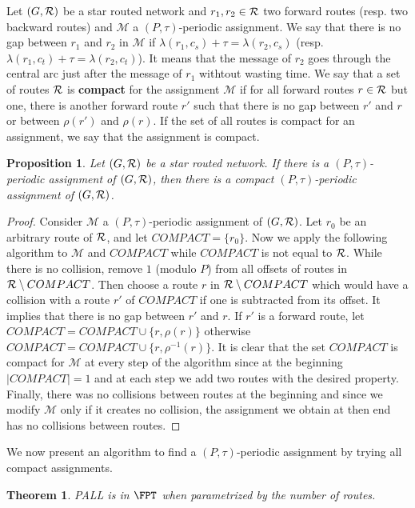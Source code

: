 \documentclass[a4paper,10pt]{article}
\newtheorem{proposition}{Proposition}
\newtheorem{theorem}{Theorem}
\begin{document}
Let $(G, {\cal R})$ be a star routed network and $r_1,r_2 \in {\cal R}$ two forward routes (resp. two backward routes) and 
$\mathcal{M}$ a $(P,\tau)$-periodic assignment. We say that there is no gap between $r_1$ and $r_2$ in $\mathcal{M}$ if $\lambda(r_1,c_s) + \tau = \lambda(r_2,c_s)$ (resp. $\lambda(r_1,c_t) + \tau = \lambda(r_2,c_t)$). It means that the message of $r_2$ goes through the central arc just after the message of $r_1$ withtout wasting time. We say that a set of routes ${\cal R}$ is \textbf{compact} for the assignment $\mathcal{M}$ if for all forward routes $r \in {\cal R}$ but one, there is another forward route $r'$ such that there is no gap between $r'$ and $r$ or between $\rho(r')$ and  $\rho(r)$. If the set of all routes is compact for an assignment, we say that the assignment is compact.

\begin{proposition}
Let $(G, {\cal R})$ be a star routed network. If there is a $(P,\tau)$-periodic assignment of $(G, {\cal R})$,
then there is a compact $(P,\tau)$-periodic assignment of $(G, {\cal R})$.
\end{proposition}
\begin{proof}
Consider $\mathcal{M}$ a $(P,\tau)$-periodic assignment of $(G, {\cal R})$.
Let $r_0$ be an arbitrary route of ${\cal R}$,  and let $COMPACT = \{r_0\}$. Now we apply the following algorithm to $\mathcal{M}$ and $COMPACT$ while $COMPACT$ is not equal to ${\cal R}$.
While there is no collision, remove $1$ (modulo $P$) from all offsets of routes in ${\cal R} \setminus COMPACT$. Then choose a route $r$ in ${\cal R} \setminus COMPACT$ which would have a collision with a route $r'$ of $COMPACT$ if one is subtracted from its offset.
It implies that there is no gap between $r'$ and $r$. If $r'$ is a forward route, let $COMPACT = COMPACT \cup \{r, \rho(r)\}$ otherwise  $COMPACT = COMPACT \cup \{r, \rho^{-1}(r)\}$. It is clear that the set $COMPACT$ is compact for $\mathcal{M}$ at every step of the algorithm since at the beginning $|COMPACT| = 1$ and at each step we add two routes with the desired property. 
Finally, there was no collisions between routes at the beginning and since we modify $\mathcal{M}$ only if it creates no collision,
the assignment we obtain at then end has no collisions between routes.
\end{proof}

We now present an algorithm to find a $(P,\tau)$-periodic assignment 
by trying all compact assignments.

\begin{theorem}
PALL is in $\FPT$ when parametrized by the number of routes.
\end{theorem}
\end{document}
